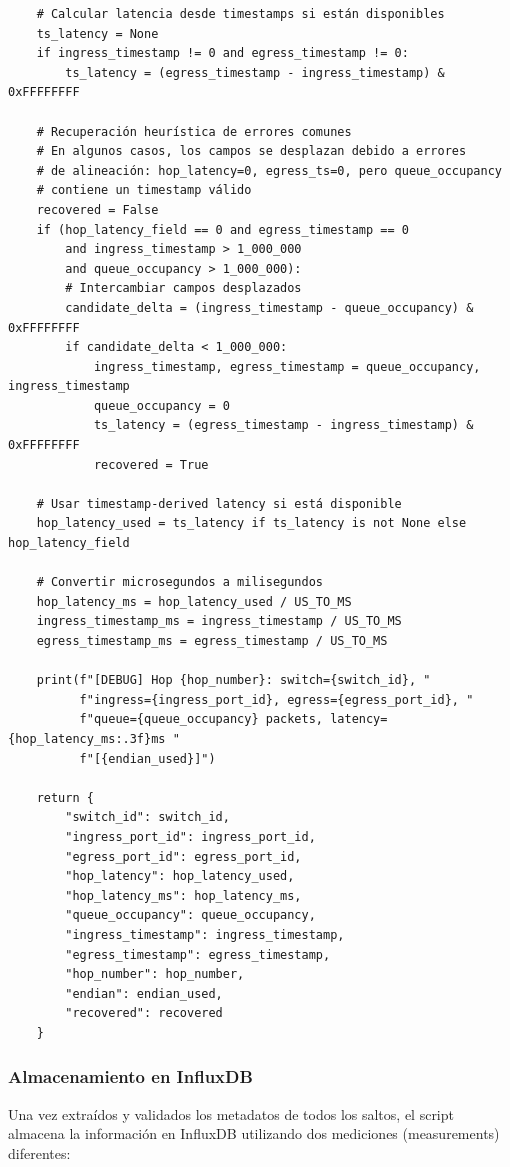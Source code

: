 \begin{lstlisting}
    # Calcular latencia desde timestamps si están disponibles
    ts_latency = None
    if ingress_timestamp != 0 and egress_timestamp != 0:
        ts_latency = (egress_timestamp - ingress_timestamp) & 0xFFFFFFFF
    
    # Recuperación heurística de errores comunes
    # En algunos casos, los campos se desplazan debido a errores
    # de alineación: hop_latency=0, egress_ts=0, pero queue_occupancy
    # contiene un timestamp válido
    recovered = False
    if (hop_latency_field == 0 and egress_timestamp == 0 
        and ingress_timestamp > 1_000_000 
        and queue_occupancy > 1_000_000):
        # Intercambiar campos desplazados
        candidate_delta = (ingress_timestamp - queue_occupancy) & 0xFFFFFFFF
        if candidate_delta < 1_000_000:
            ingress_timestamp, egress_timestamp = queue_occupancy, ingress_timestamp
            queue_occupancy = 0
            ts_latency = (egress_timestamp - ingress_timestamp) & 0xFFFFFFFF
            recovered = True
    
    # Usar timestamp-derived latency si está disponible
    hop_latency_used = ts_latency if ts_latency is not None else hop_latency_field
    
    # Convertir microsegundos a milisegundos
    hop_latency_ms = hop_latency_used / US_TO_MS
    ingress_timestamp_ms = ingress_timestamp / US_TO_MS
    egress_timestamp_ms = egress_timestamp / US_TO_MS
    
    print(f"[DEBUG] Hop {hop_number}: switch={switch_id}, "
          f"ingress={ingress_port_id}, egress={egress_port_id}, "
          f"queue={queue_occupancy} packets, latency={hop_latency_ms:.3f}ms "
          f"[{endian_used}]")
    
    return {
        "switch_id": switch_id,
        "ingress_port_id": ingress_port_id,
        "egress_port_id": egress_port_id,
        "hop_latency": hop_latency_used,
        "hop_latency_ms": hop_latency_ms,
        "queue_occupancy": queue_occupancy,
        "ingress_timestamp": ingress_timestamp,
        "egress_timestamp": egress_timestamp,
        "hop_number": hop_number,
        "endian": endian_used,
        "recovered": recovered
    }
\end{lstlisting}

\subsubsection{Almacenamiento en InfluxDB}
Una vez extraídos y validados los metadatos de todos los saltos, el script almacena la información en InfluxDB utilizando dos mediciones (measurements) diferentes:


